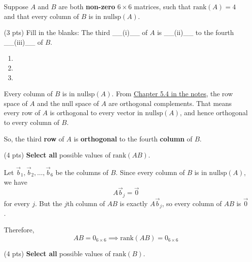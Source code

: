 \documentclass[11pt]{article}
\begin{document}
\begin{prob}[(11 pts)]
Suppose $A$ and $B$ are both \textbf{non-zero} $6 \times 6$ matrices, such that $\text{rank}(A) = 4$ and that every column of $B$ is in $\text{nullsp}(A)$.

\begin{subprob}(3 pts)
Fill in the blanks: The third \_\_(i)\_\_ of $A$ is \_\_(ii)\_\_ to the fourth \_\_(iii)\_\_ of $B$.

\begin{enumerate}[label=(\roman*)]
    \item {} 
    \item {} 
    \item {} 
\end{enumerate}

\begin{solution}
Every column of $B$ is in $\text{nullsp}(A)$. From \href{https://notes.eecs245.org/matrices/null-space-rank-nullity/\#example-orthogonal-complements}{Chapter 5.4 in the notes}, the row space of $A$ and the null space of $A$ are orthogonal complements. That means every row of $A$ is orthogonal to every vector in $\text{nullsp}(A)$, and hence orthogonal to every column of $B$.

So, the third \textbf{row} of $A$ is \textbf{orthogonal} to the fourth \textbf{column} of $B$.
\end{solution}
\end{subprob}

\begin{subprob}(4 pts)
\textbf{Select all} possible values of $\text{rank}(AB)$.


\begin{solution}
Let $\vec b_1, \vec b_2, \ldots, \vec b_6$ be the columns of $B$. Since every column of $B$ is in $\text{nullsp}(A)$, we have
\[
A \vec b_j = \vec 0
\]
for every $j$. But the $j$th column of $AB$ is exactly $A \vec b_j$, so every column of $AB$ is $\vec 0$.

Therefore,
\[
AB = 0_{6 \times 6} \implies \text{rank}(AB) = 0_{6 \times 6}
\]
\end{solution}
\end{subprob} 

\begin{subprob}(4 pts)
\textbf{Select all} possible values of $\text{rank}(B)$.


\end{subprob}
\end{prob}
\end{document}
